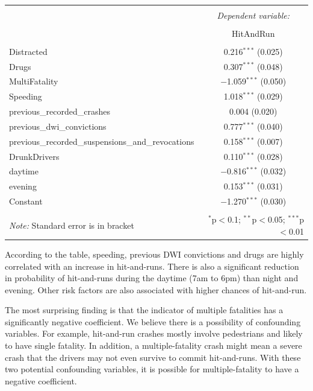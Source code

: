 \documentclass[11pt, oneside,titlepage]{article}   	%
\begin{document}
\begin{table}[!htbp] \centering 
	\caption{} 
	\label{} 
	\begin{tabular}{@{\extracolsep{5pt}}lc} 
		\\[-1.8ex]\hline 
		\hline \\[-1.8ex] 
		& \multicolumn{1}{c}{\textit{Dependent variable:}} \\ 
		\cline{2-2} 
		\\[-1.8ex] & HitAndRun \\ 
		\hline \\[-1.8ex] 
		Distracted & 0.216$^{***}$ (0.025) \\ 
		Drugs & 0.307$^{***}$ (0.048) \\ 
		MultiFatality & $-$1.059$^{***}$ (0.050) \\ 
		Speeding & 1.018$^{***}$ (0.029) \\ 
		previous\_recorded\_crashes & 0.004 (0.020) \\ 
		previous\_dwi\_convictions & 0.777$^{***}$ (0.040) \\ 
		previous\_recorded\_suspensions\_and\_revocations & 0.158$^{***}$ (0.007) \\ 
		DrunkDrivers & 0.110$^{***}$ (0.028) \\ 
		daytime & $-$0.816$^{***}$ (0.032) \\ 
		evening & 0.153$^{***}$ (0.031) \\ 
		Constant & $-$1.270$^{***}$ (0.030) \\  
		\hline \\[-1.8ex] 
		\textit{Note:} Standard error is in bracket & \multicolumn{1}{r}{$^{*}$p$<$0.1; $^{**}$p$<$0.05; $^{***}$p$<$0.01} \\ 
	\end{tabular} 
\end{table} 

According to the table, speeding, previous DWI convictions and drugs are highly correlated with an increase in hit-and-runs. There is also a significant reduction in probability of hit-and-runs during the daytime (7am to 6pm) than night and evening. Other risk factors are also associated with higher chances of hit-and-run. 

The most surprising finding is that the indicator of multiple fatalities has a significantly negative coefficient. We believe there is a possibility of confounding variables. For example, hit-and-run crashes mostly involve pedestrians and likely to have single fatality. In addition, a multiple-fatality crash might mean a severe crash that the drivers may not even survive to commit hit-and-runs. With these two potential confounding variables, it is possible for multiple-fatality to have a negative coefficient.  
\end{document}
